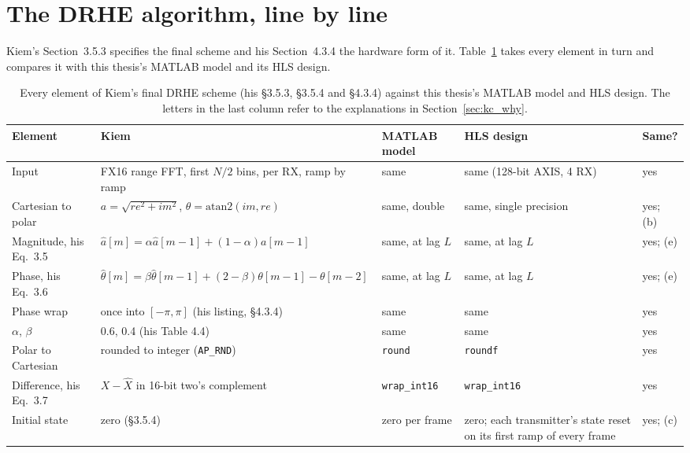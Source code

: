 \section{The DRHE algorithm, line by line}
\label{sec:kc_audit}

Kiem's Section~3.5.3 specifies the final scheme and his Section~4.3.4 the
hardware form of it. Table~\ref{tab:kc_audit} takes every element in turn and
compares it with this thesis's MATLAB model and its HLS design.

\begin{table}[p]
\centering
\caption[DRHE audit against Kiem's specification]{Every element of Kiem's final
DRHE scheme (his \S{}3.5.3, \S{}3.5.4 and \S{}4.3.4) against this thesis's MATLAB
model and HLS design. The letters in the last column refer to the explanations
in Section~\ref{sec:kc_why}.}
\label{tab:kc_audit}
\scriptsize
\renewcommand{\arraystretch}{1.25}
\setlength{\tabcolsep}{3pt}
\begin{tabular}{@{}>{\raggedright}p{}>{\raggedright}p{}>{\raggedright}p{}>{\raggedright}p{}>{\raggedright\arraybackslash}p{}@{}}
\toprule
Element & Kiem & MATLAB model & HLS design & Same?\\
\midrule
Input & FX16 range FFT, first $N/2$ bins, per RX, ramp by ramp & same & same (128-bit AXIS, 4 RX) & yes\\
Cartesian to polar & $a = \sqrt{re^2+im^2}$, $\theta = \mathrm{atan2}(im, re)$ & same, double & same, single precision & yes; (b)\\
Magnitude, his Eq.~3.5 & $\hat a[m] = \alpha\hat a[m-1] + (1-\alpha)a[m-1]$ & same, at lag $L$ & same, at lag $L$ & yes; (e)\\
Phase, his Eq.~3.6 & $\hat\theta[m] = \beta\hat\theta[m-1] + (2-\beta)\theta[m-1] - \theta[m-2]$ & same, at lag $L$ & same, at lag $L$ & yes; (e)\\
Phase wrap & once into $[-\pi,\pi]$ (his listing, \S{}4.3.4) & same & same & yes\\
$\alpha$, $\beta$ & 0.6, 0.4 (his Table 4.4) & same & same & yes\\
Polar to Cartesian & rounded to integer (\texttt{AP\_RND}) & \texttt{round} & \texttt{roundf} & yes\\
Difference, his Eq.~3.7 & $X - \hat X$ in 16-bit two's complement & \texttt{wrap\_int16} & \texttt{wrap\_int16} & yes\\
Initial state & zero (\S{}3.5.4) & zero per frame & zero; each transmitter's state reset on its first ramp of every frame & yes; (c)\\

\end{tabular}
\end{table}
